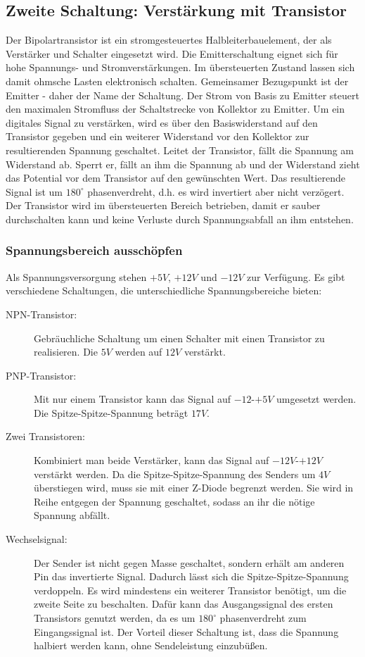 \subsection{Zweite Schaltung: Verstärkung mit Transistor}
Der Bipolartransistor ist ein stromgesteuertes Halbleiterbauelement, der als Verstärker und Schalter eingesetzt wird. Die Emitterschaltung eignet sich für hohe Spannungs- und Stromverstärkungen. Im übersteuerten Zustand lassen sich damit ohmsche Lasten elektronisch schalten. Gemeinsamer Bezugspunkt ist der Emitter - daher der Name der Schaltung. Der Strom von Basis zu Emitter steuert den maximalen Stromfluss der Schaltstrecke von Kollektor zu Emitter. Um ein digitales Signal zu verstärken, wird es über den Basiswiderstand auf den Transistor gegeben und ein weiterer Widerstand vor den Kollektor zur resultierenden Spannung geschaltet. Leitet der Transistor, fällt die Spannung am Widerstand ab. Sperrt er, fällt an ihm die Spannung ab und der Widerstand zieht das Potential vor dem Transistor auf den gewünschten Wert. Das resultierende Signal ist um $180^\circ$ phasenverdreht, d.h. es wird invertiert aber nicht verzögert. Der Transistor wird im übersteuerten Bereich betrieben, damit er sauber durchschalten kann und keine Verluste durch Spannungsabfall an ihm entstehen. \\


\subsubsection{Spannungsbereich ausschöpfen}
Als Spannungsversorgung stehen $+5V$, $+12V$ und $-12V$ zur Verfügung. Es gibt verschiedene Schaltungen, die unterschiedliche Spannungsbereiche bieten:
\begin{description}
	\item[NPN-Transistor:] Gebräuchliche Schaltung um einen Schalter mit einen Transistor zu realisieren. Die $5V$ werden auf $12V$ verstärkt.
	\item[PNP-Transistor:] Mit nur einem Transistor kann das Signal auf $-12$-$+5V$ umgesetzt werden. Die Spitze-Spitze-Spannung beträgt $17V$.
	\item[Zwei Transistoren:] Kombiniert man beide Verstärker, kann das Signal auf $-12V$-$+12V$ verstärkt werden. Da die Spitze-Spitze-Spannung des Senders um $4V$ überstiegen wird, muss sie mit einer Z-Diode begrenzt werden. Sie wird in Reihe entgegen der Spannung geschaltet, sodass an ihr die nötige Spannung abfällt.
	\item[Wechselsignal:] Der Sender ist nicht gegen Masse geschaltet, sondern erhält am anderen Pin das invertierte Signal. Dadurch lässt sich die Spitze-Spitze-Spannung verdoppeln. Es wird mindestens ein weiterer Transistor benötigt, um die zweite Seite zu beschalten. Dafür kann das Ausgangssignal des ersten Transistors genutzt werden, da es um $180^\circ$ phasenverdreht zum Eingangssignal ist. Der Vorteil dieser Schaltung ist, dass die Spannung halbiert werden kann, ohne Sendeleistung einzubüßen.
\end{description}

